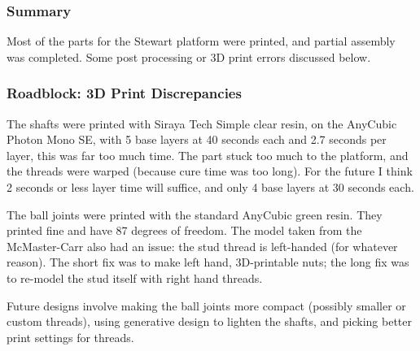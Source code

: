 \documentclass[a4paper, 10pt]{article}
\begin{document}
		\subsubsection{Summary}
		Most of the parts for the Stewart platform were printed, and partial assembly was completed. Some post processing or 3D print errors discussed below.
		
		\subsubsection{Roadblock: 3D Print Discrepancies}
		The shafts were printed with Siraya Tech Simple clear resin, on the AnyCubic Photon Mono SE, with 5 base layers at 40 seconds each and 2.7 seconds per layer, this was far too much time. The part stuck too much to the platform, and the threads were warped (because cure time was too long). For the future I think 2 seconds or less layer time will suffice, and only 4 base layers at 30 seconds each. 
		
		The ball joints were printed with the standard AnyCubic green resin. They printed fine and have 87 degrees of freedom. The model taken from the McMaster-Carr also had an issue: the stud thread is left-handed (for whatever reason). The short fix was to make left hand, 3D-printable nuts; the long fix was to re-model the stud itself with right hand threads.
		
		Future designs involve making the ball joints more compact (possibly smaller or custom threads), using generative design to lighten the shafts, and picking better print settings for threads.
\end{document}
